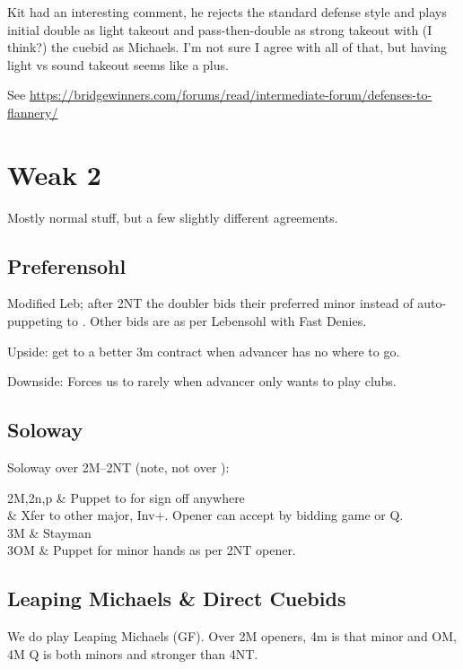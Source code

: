 \documentclass[main]{subfile}
\begin{document}
	Kit had an interesting comment, he rejects the standard defense style and plays initial double as light takeout and pass-then-double as strong takeout with (I think?) the  cuebid as Michaels. I'm not sure I agree with all of that, but having light vs sound takeout seems like a plus.
	
	See \url{https://bridgewinners.com/forums/read/intermediate-forum/defenses-to-flannery/}
	
	\section{Weak 2}
	
	Mostly normal stuff, but a few slightly different agreements.
	
	\subsection{Preferensohl}
	
	Modified Leb; after 2NT the doubler bids their preferred minor instead of auto-puppeting to . Other bids are as per Lebensohl with Fast Denies.
	
	Upside: get to a better 3m contract when advancer has no where to go.
	
	Downside: Forces us to  rarely when advancer only wants to play clubs. 
	
	\subsection{Soloway}

	Soloway over 2M--2NT (note, not over ):
	
	\begin{compbidtable}{2M,2n,p}
		 & Puppet to  for sign off anywhere \\
		 & Xfer to other major, Inv+. Opener can accept by bidding game or Q. \\
		3M & Stayman \\
		3OM & Puppet for minor hands as per 2NT opener. \\
	\end{compbidtable}

	\subsection{Leaping Michaels \& Direct Cuebids}
	
	We do play Leaping Michaels (GF). Over 2M openers, 4m is that minor and OM, 4M Q is both minors and stronger than 4NT. 
	
\end{document}
